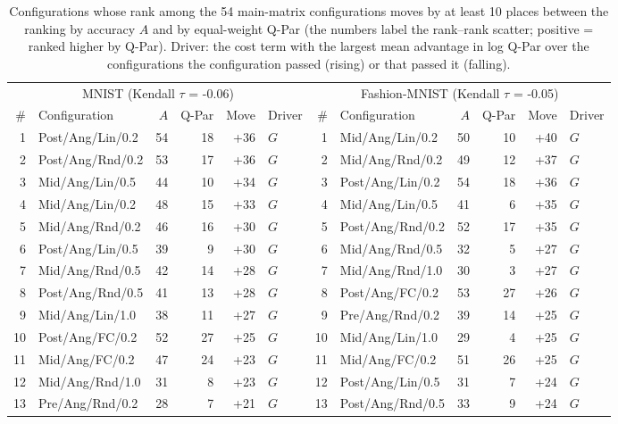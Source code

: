\begin{table}[!t]
\centering
\caption{Configurations whose rank among the 54 main-matrix configurations moves by at least 10 places between the ranking by accuracy $A$ and by equal-weight Q-Par (the numbers label the rank--rank scatter; positive = ranked higher by Q-Par). Driver: the cost term with the largest mean advantage in log Q-Par over the configurations the configuration passed (rising) or that passed it (falling).}
\label{tab:rank_moves}
\scriptsize
\begin{tabular}{rlrrrlrlrrrl}
\toprule
\multicolumn{6}{c}{MNIST (Kendall $\tau$ = -0.06)} & \multicolumn{6}{c}{Fashion-MNIST (Kendall $\tau$ = -0.05)} \\
\cmidrule(lr){1-6} \cmidrule(lr){7-12}
\# & Configuration & $A$ & Q-Par & Move & Driver & \# & Configuration & $A$ & Q-Par & Move & Driver \\
\midrule
1 & Post/Ang/Lin/0.2 & 54 & 18 & +36 & $G$ & 1 & Mid/Ang/Lin/0.2 & 50 & 10 & +40 & $G$ \\
2 & Post/Ang/Rnd/0.2 & 53 & 17 & +36 & $G$ & 2 & Mid/Ang/Rnd/0.2 & 49 & 12 & +37 & $G$ \\
3 & Mid/Ang/Lin/0.5 & 44 & 10 & +34 & $G$ & 3 & Post/Ang/Lin/0.2 & 54 & 18 & +36 & $G$ \\
4 & Mid/Ang/Lin/0.2 & 48 & 15 & +33 & $G$ & 4 & Mid/Ang/Lin/0.5 & 41 & 6 & +35 & $G$ \\
5 & Mid/Ang/Rnd/0.2 & 46 & 16 & +30 & $G$ & 5 & Post/Ang/Rnd/0.2 & 52 & 17 & +35 & $G$ \\
6 & Post/Ang/Lin/0.5 & 39 & 9 & +30 & $G$ & 6 & Mid/Ang/Rnd/0.5 & 32 & 5 & +27 & $G$ \\
7 & Mid/Ang/Rnd/0.5 & 42 & 14 & +28 & $G$ & 7 & Mid/Ang/Rnd/1.0 & 30 & 3 & +27 & $G$ \\
8 & Post/Ang/Rnd/0.5 & 41 & 13 & +28 & $G$ & 8 & Post/Ang/FC/0.2 & 53 & 27 & +26 & $G$ \\
9 & Mid/Ang/Lin/1.0 & 38 & 11 & +27 & $G$ & 9 & Pre/Ang/Rnd/0.2 & 39 & 14 & +25 & $G$ \\
10 & Post/Ang/FC/0.2 & 52 & 27 & +25 & $G$ & 10 & Mid/Ang/Lin/1.0 & 29 & 4 & +25 & $G$ \\
11 & Mid/Ang/FC/0.2 & 47 & 24 & +23 & $G$ & 11 & Mid/Ang/FC/0.2 & 51 & 26 & +25 & $G$ \\
12 & Mid/Ang/Rnd/1.0 & 31 & 8 & +23 & $G$ & 12 & Post/Ang/Lin/0.5 & 31 & 7 & +24 & $G$ \\
13 & Pre/Ang/Rnd/0.2 & 28 & 7 & +21 & $G$ & 13 & Post/Ang/Rnd/0.5 & 33 & 9 & +24 & $G$ \\

\end{tabular}
\end{table}
